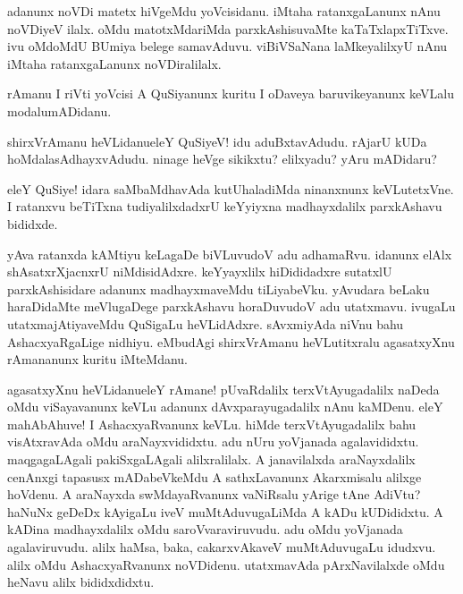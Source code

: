 \begin{mng}
adanunx noVDi matetx hiVgeMdu yoVcisidanu. iMtaha ratanxgaLanunx nAnu noVDiyeV ilalx. oMdu matotxMdariMda parxkAshisuvaMte kaTaTxlapxTiTxve. ivu oMdoMdU BUmiya belege samavAduvu. viBiVSaNana laMkeyalilxyU nAnu iMtaha ratanxgaLanunx noVDiralilalx.
\end{mng}

\begin{mng}
rAmanu I riVti yoVcisi A QuSiyanunx kuritu I oDaveya baruvikeyanunx keVLalu modalumADidanu.
\end{mng}

\begin{mng}
shirxVrAmanu heVLidanu\mdash eleY QuSiyeV! idu aduBxtavAdudu. rAjarU kUDa hoMdalasAdhayxvAdudu. ninage heVge sikikxtu? elilxyadu? yAru mADidaru?
\end{mng}

\begin{mng}
eleY QuSiye! idara saMbaMdhavAda kutUhaladiMda ninanxnunx keVLutetxVne. I ratanxvu beTiTxna tudiyalilxdadxrU keYyiyxna madhayxdalilx parxkAshavu bididxde.
\end{mng}

\begin{mng}
yAva ratanxda kAMtiyu keLagaDe biVLuvudoV adu adhamaRvu. idanunx elAlx shAsatxrXjacnxrU niMdisidAdxre. keYyayxlilx hiDididadxre sutatxlU parxkAshisidare adanunx madhayxmaveMdu tiLiyabeVku. yAvudara beLaku haraDidaMte meVlugaDege parxkAshavu horaDuvudoV adu utatxmavu. ivugaLu utatxmajAtiyaveMdu QuSigaLu heVLidAdxre. sAvxmiyAda niVnu bahu AshacxyaRgaLige nidhiyu. eMbudAgi shirxVrAmanu heVLutitxralu agasatxyXnu rAmananunx kuritu iMteMdanu.
\end{mng}

\begin{mng}
agasatxyXnu heVLidanu\mdash eleY rAmane! pUvaRdalilx terxVtAyugadalilx naDeda oMdu viSayavanunx keVLu adanunx dAvxparayugadalilx nAnu kaMDenu. eleY mahAbAhuve! I AshacxyaRvanunx keVLu. hiMde terxVtAyugadalilx bahu visAtxravAda oMdu araNayxvididxtu. adu nUru yoVjanada agalavididxtu. maqgagaLAgali pakiSxgaLAgali alilxralilalx. A janavilalxda araNayxdalilx cenAnxgi tapasusx mADabeVkeMdu A sathxLavanunx Akarxmisalu alilxge hoVdenu. A araNayxda swMdayaRvanunx vaNiRsalu yArige tAne AdiVtu? haNuNx geDeDx kAyigaLu iveV muMtAduvugaLiMda A kADu kUDididxtu. A kADina madhayxdalilx oMdu saroVvaraviruvudu. adu oMdu yoVjanada agalaviruvudu. alilx haMsa, baka, cakarxvAkaveV muMtAduvugaLu idudxvu. alilx oMdu AshacxyaRvanunx noVDidenu. utatxmavAda pArxNavilalxde oMdu heNavu alilx bididxdidxtu.
\end{mng}

